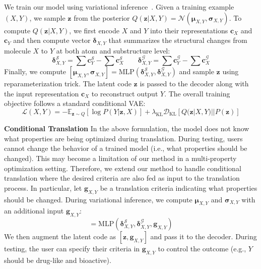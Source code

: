 \documentclass{article} \usepackage{iclr2020_conference,times}
\newcommand{\loss}{\mathcal{L}}
\newcommand{\graph}{\mathcal{G}}
\newcommand{\MLP}{\mathrm{MLP}}
\def\vmu{{\bm{\mu}}}
\def\vdelta{{\bm{\delta}}}
\def\vsigma{{\bm{\sigma}}}
\def\vc{{\bm{c}}}
\def\vg{{\bm{g}}}
\def\vz{{\bm{z}}}
\def\gD{{\mathcal{D}}}
\def\gN{{\mathcal{N}}}
\def\gS{{\mathcal{S}}}
\begin{document}
We train our model using variational inference~\citep{kingma2013auto}. Given a training example $(X,Y)$, we sample $\vz$ from the posterior $Q(\vz | X,Y) = \gN(\vmu_{X,Y}, \vsigma_{X,Y})$. To compute $Q(\vz | X,Y)$, we first encode $X$ and $Y$ into their representations $\vc_X$ and $\vc_Y$ and then compute vector $\vdelta_{X,Y}$ that summarizes the structural changes from molecule $X$ to $Y$ at both atom and substructure level:
\begin{equation}
    \vdelta_{X,Y}^\gS = \sum \vc_Y^\gS - \sum \vc_X^\gS \qquad 
    \vdelta_{X,Y}^\graph = \sum \vc_Y^\graph - \sum \vc_X^\graph
    \label{eq:vae_diff}
\end{equation}
Finally, we compute $[\vmu_{X,Y}, \vsigma_{X,Y}] = \MLP(\vdelta_{X,Y}^\gS, \vdelta_{X,Y}^\graph)$ and sample $\vz$ using reparameterization trick. The latent code $\vz$ is passed to the decoder along with the input representation $\vc_X$ to reconstruct output $Y$. The overall training objective follows a standard conditional VAE:
\begin{equation}
    \loss(X,Y) = - \mathbb{E}_{\vz \sim Q}[\log P(Y | \vz,X)] + \lambda_{\text{KL}}\gD_{\text{KL}}[Q(\vz|X,Y) || P(\vz)]
\end{equation}


\textbf{Conditional Translation } In the above formulation, the model does not know what properties are being optimized during translation. During testing, users cannot change the behavior of a trained model (i.e., what properties should be changed). This may become a limitation of our method in a multi-property optimization setting. Therefore, we extend our method to handle conditional translation where the desired criteria are also fed as input to the translation process. In particular, let $\vg_{X,Y}$ be a translation criteria indicating what properties should be changed. During variational inference, we compute $\vmu_{X,Y}$ and  $\vsigma_{X,Y}$ with an additional input $\vg_{X,Y}$:
\begin{equation}
   [\vmu_{X,Y}, \vsigma_{X,Y}] = \MLP(\vdelta_{X,Y}^\gS, \vdelta_{X,Y}^\graph, \vg_{X,Y})
\end{equation}
We then augment the latent code as $[\vz, \vg_{X,Y}]$ and pass it to the decoder.
During testing, the user can specify their criteria in $\vg_{X,Y}$ to control the outcome (e.g., $Y$ should be drug-like and bioactive).
\end{document}
